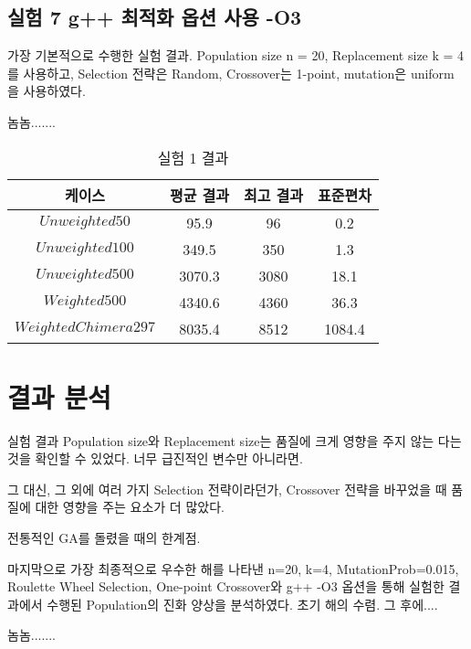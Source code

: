 \documentclass{article}
\begin{document}
\subsection{실험 7 g++ 최적화 옵션 사용 -O3}

가장 기본적으로 수행한 실험 결과. Population size n = 20, Replacement size k = 4를 사용하고, Selection 전략은 Random, Crossover는 1-point, mutation은 uniform 을 사용하였다.

놈놈.......


 \begin{table}[h]
 \begin{center}
\caption{실험 1 결과}
\begin{tabular}{cccc}
\hline\hline
케이스 & 평균 결과 & 최고 결과 & 표준편차\\
\hline\hline
$Unweighted 50$ & 95.9 & 96 & 0.2 \\
\hline
$Unweighted 100$ & 349.5 & 350 & 1.3\\
\hline
$Unweighted 500$ & 3070.3 & 3080 & 18.1\\
\hline
$Weighted 500$ & 4340.6 & 4360 & 36.3\\
\hline
$Weighted Chimera 297$ & 8035.4 & 8512 & 1084.4\\
\hline
\end{tabular}
\end{center}
\end{table}

\section{ 결과 분석 }

실험 결과 Population size와 Replacement size는 품질에 크게 영향을 주지 않는 다는 것을 확인할 수 있었다. 너무 급진적인 변수만 아니라면.

그 대신, 그 외에 여러 가지 Selection 전략이라던가, Crossover 전략을 바꾸었을 때 품질에 대한 영향을 주는 요소가 더 많았다.

전통적인 GA를 돌렸을 때의 한계점.

마지막으로 가장 최종적으로 우수한 해를 나타낸 n=20, k=4, MutationProb=0.015, Roulette Wheel Selection, One-point Crossover와 g++ -O3 옵션을 통해 실험한 결과에서 수행된 Population의 진화 양상을 분석하였다.
초기 해의 수렴. 그 후에....

놈놈.......
\end{document}
